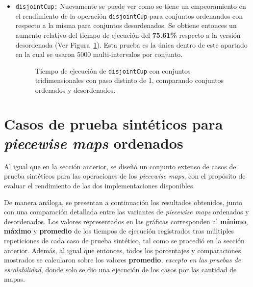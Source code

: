 \begin{itemize}
\begin{itemize}
         \item \texttt{disjointCup:} 
        Nuevamente se puede ver como se tiene un empeoramiento en el rendimiento de la operación \texttt{disjointCup} para conjuntos ordenandos con respecto a la misma para conjuntos desordenados. 
         Se obtiene entonces un aumento relativo del tiempo de ejecución del \textbf{75{.}61\%} respecto a la versión desordenada (Ver Figura~\ref{fig:Ren-dis-3d}). Esta prueba es la única dentro de este apartado en la cual se usaron 5000 multi-intervalos por conjunto.

        \begin{figure}[htbp]
          \centering
          \caption{Tiempo de ejecución de \texttt{disjointCup} con conjuntos tridimensionales con paso distinto de 1, comparando conjuntos ordenados y desordenados.}
          \label{fig:Ren-dis-3d}
        \end{figure}
    \end{itemize}
\end{itemize}


\section{Casos de prueba sintéticos para \textit{piecewise maps} ordenados}

Al igual que en la sección anterior, se diseñó un conjunto extenso de casos de prueba 
sintéticos para las operaciones de los \textit{piecewise maps}, con el propósito de 
evaluar el rendimiento de las dos implementaciones disponibles.  

De manera análoga, se presentan a continuación los resultados obtenidos, junto con una 
comparación detallada entre las variantes de \textit{piecewise maps} ordenados y 
desordenados. Los valores representados en las gráficas corresponden al 
\textbf{mínimo}, \textbf{máximo} y \textbf{promedio} de los tiempos de ejecución 
registrados tras múltiples repeticiones de cada caso de prueba sintético, tal como se 
procedió en la sección anterior. Además, al igual que entonces, todos los porcentajes 
y comparaciones mostrados se calcularon sobre los valores \textbf{promedio}, 
\textit{excepto en las pruebas de escalabilidad}, donde solo se dio una ejecución de los casos por las cantidad de mapas.

